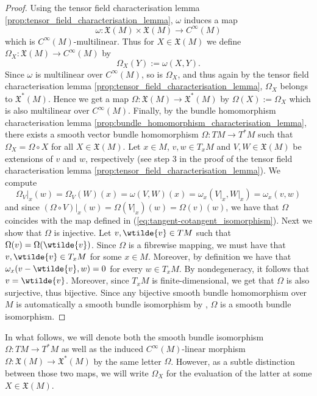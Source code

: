 \begin{proof}
	Using the tensor field characterisation lemma \ref{prop:tensor_field_characterisation_lemma}, $\omega$ induces a map 
	\begin{equation*}
		\omega : \mathfrak{X}(M) \times \mathfrak{X}(M) \to C^\infty(M)
	\end{equation*}
	\noindent which is $C^\infty(M)$-multilinear. Thus for $X \in \mathfrak{X}(M)$ we define $\Omega_X : \mathfrak{X}(M) \to C^\infty(M)$ by
	\begin{equation*}
		\Omega_X(Y) := \omega(X,Y).
	\end{equation*}
	Since $\omega$ is multilinear over $C^\infty(M)$, so is $\Omega_X$, and thus again by the tensor field characterisation lemma \ref{prop:tensor_field_characterisation_lemma}, $\Omega_X$ belongs to $\mathfrak{X}^*(M)$. Hence we get a map $\Omega : \mathfrak{X}(M) \to \mathfrak{X}^*(M)$ by $\Omega(X) := \Omega_X$ which is also multilinear over $C^\infty(M)$. Finally, by the bundle homomorphism characterisation lemma \ref{prop:bundle_homomorphism_characterisation_lemma}, there exists a smooth vector bundle homomorphism $\Omega : TM \to T^*M$ such that $\Omega_X = \Omega \circ X$ for all $X \in \mathfrak{X}(M)$. Let $x \in M$, $v,w \in T_xM$ and $V,W \in \mathfrak{X}(M)$ be extensions of $v$ and $w$, respectively (see step 3 in the proof of the tensor field characterisation lemma \ref{prop:tensor_field_characterisation_lemma}). We compute
	\begin{equation*}
		\Omega_V\vert_x(w) = \Omega_V(W)(x) = \omega(V,W)(x) = \omega_x(V\vert_x,W\vert_x) = \omega_x(v,w)
	\end{equation*}
	\noindent and since $(\Omega \circ V)\vert_x(w) = \Omega(V\vert_x)(w) = \Omega(v)(w)$, we have that $\Omega$ coincides with the map defined in (\ref{eq:tangent-cotangent_isomorphism}). Next we show that $\Omega$ is injective. Let $v,\wtilde{v} \in TM$ such that $\Omega(v) = \Omega(\wtilde{v})$. Since $\Omega$ is a fibrewise mapping, we must have that $v,\wtilde{v} \in T_xM$ for some $x \in M$. Moreover, by definition we have that $\omega_x(v - \wtilde{v},w) = 0$ for every $w \in T_xM$. By nondegeneracy, it follows that $v = \wtilde{v}$. Moreover, since $T_xM$ is finite-dimensional, we get that $\Omega$ is also surjective, thus bijective. Since any bijective smooth bundle homomorphism over $M$ is automatically a smooth bundle isomorphism by \cite[262]{lee:smooth_manifolds:2013}, $\Omega$ is a smooth bundle isomorphism.
\end{proof}

\begin{remark}
	In what follows, we will denote both the smooth bundle isomorphism $\Omega : TM \to T^*M$ as well as the induced $C^\infty(M)$-linear morphism $\Omega : \mathfrak{X}(M) \to \mathfrak{X}^*(M)$ by the same letter $\Omega$. However, as a subtle distinction between those two maps, we will write $\Omega_X$ for the evaluation of the latter at some $X \in \mathfrak{X}(M)$.
\end{remark}
